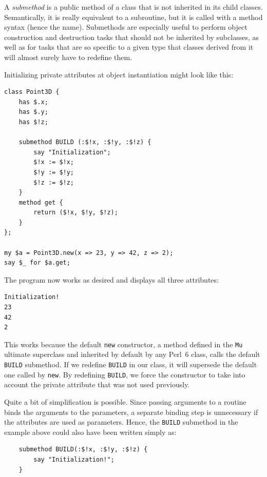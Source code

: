 A \emph{submethod} is a public method of a class that is not inherited 
in its child classes. Semantically, it is really equivalent 
to a subroutine, but it is called with a method syntax (hence 
the name). Submethods are especially useful to perform object 
construction and destruction tasks that should not be 
inherited by subclasses, as well as for tasks that are 
so specific to a given type that classes derived from it  
will almost surely have to redefine them.

Initializing private attributes at object instantiation 
might look like this:

\begin{verbatim}
class Point3D {
    has $.x;
    has $.y;
    has $!z;

    submethod BUILD (:$!x, :$!y, :$!z) {
        say "Initialization";
        $!x := $!x; 
        $!y := $!y; 
        $!z := $!z;
    }
    method get {
        return ($!x, $!y, $!z);
    }
};

my $a = Point3D.new(x => 23, y => 42, z => 2);
say $_ for $a.get;
\end{verbatim}

The program now works as desired and displays all 
three attributes:

\begin{verbatim}
Initialization!
23
42
2
\end{verbatim}

This works because the default {\tt new} constructor, a method 
defined in the {\tt Mu} ultimate superclass and inherited by 
default by any Perl~6 class, calls 
the default {\tt BUILD} submethod. If we redefine {\tt BUILD} 
in our class, it will supersede the default one 
called by {\tt new}. By redefining {\tt BUILD}, we force 
the constructor to take into account the private attribute that 
was not used previously.

Quite a bit of simplification is possible. Since passing arguments 
to a routine binds the arguments to the parameters, a separate 
binding step is unnecessary if the attributes are used as 
parameters. Hence, the {\tt BUILD} submethod in the example 
above could also have been written simply as:

\begin{verbatim}
    submethod BUILD(:$!x, :$!y, :$!z) {
        say "Initialization!";
    }
\end{verbatim}


